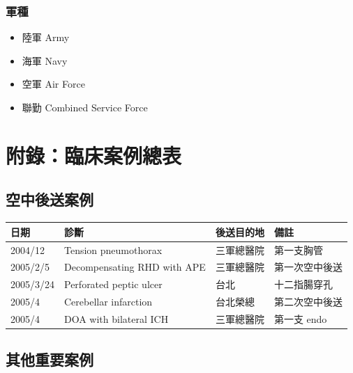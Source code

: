 \documentclass[12pt,a4paper]{article}
\begin{document}
\subsubsection{軍種}

\begin{itemize}
    \item 陸軍 Army
    \item 海軍 Navy
    \item 空軍 Air Force
    \item 聯勤 Combined Service Force
\end{itemize}

\section{附錄：臨床案例總表}

\subsection{空中後送案例}

\begin{longtable}{p{2cm}p{4.5cm}p{3cm}p{4cm}}
\toprule
\textbf{日期} & \textbf{診斷} & \textbf{後送目的地} & \textbf{備註} \\
\midrule
\endhead
2004/12 & Tension pneumothorax & 三軍總醫院 & 第一支胸管 \\
2005/2/5 & Decompensating RHD with APE & 三軍總醫院 & 第一次空中後送 \\
2005/3/24 & Perforated peptic ulcer & 台北 & 十二指腸穿孔 \\
2005/4 & Cerebellar infarction & 台北榮總 & 第二次空中後送 \\
2005/4 & DOA with bilateral ICH & 三軍總醫院 & 第一支 endo \\
\bottomrule
\end{longtable}

\subsection{其他重要案例}
\end{document}

